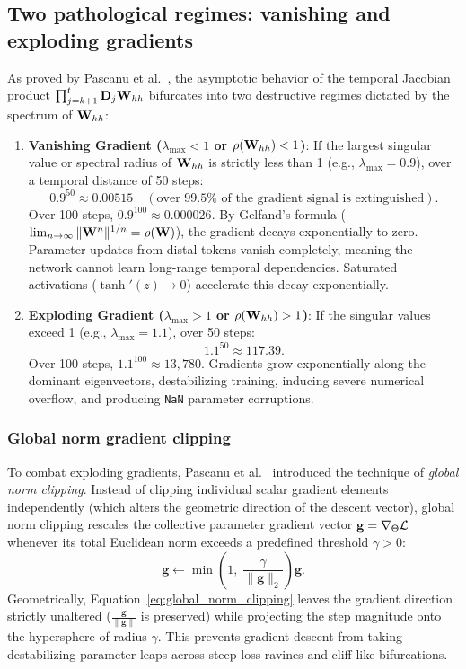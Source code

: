 \documentclass[../../main.tex]{subfiles}
\begin{document}
\subsection{Two pathological regimes: vanishing and exploding gradients}
As proved by Pascanu et al.~\cite{pascanu2013difficulty}, the asymptotic behavior of the temporal Jacobian product $\prod_{j=k+1}^t \mathbf{D}_j \mathbf{W}_{hh}$ bifurcates into two destructive regimes dictated by the spectrum of $\mathbf{W}_{hh}$:
\begin{enumerate}
    \item \textbf{Vanishing Gradient ($\lambda_{\max} < 1$ or $\rho(\mathbf{W}_{hh}) < 1$)}: If the largest singular value or spectral radius of $\mathbf{W}_{hh}$ is strictly less than 1 (e.g., $\lambda_{\max} = 0.9$), over a temporal distance of 50 steps:
    \[
    0.9^{50} \approx 0.00515 \quad (\text{over } 99.5\% \text{ of the gradient signal is extinguished}).
    \]
    Over 100 steps, $0.9^{100} \approx 0.000026$. By Gelfand's formula ($\lim_{n \to \infty} \|\mathbf{W}^n\|^{1/n} = \rho(\mathbf{W})$), the gradient decays exponentially to zero. Parameter updates from distal tokens vanish completely, meaning the network cannot learn long-range temporal dependencies. Saturated activations ($\tanh'(z) \to 0$) accelerate this decay exponentially.
    \item \textbf{Exploding Gradient ($\lambda_{\max} > 1$ or $\rho(\mathbf{W}_{hh}) > 1$)}: If the singular values exceed 1 (e.g., $\lambda_{\max} = 1.1$), over 50 steps:
    \[
    1.1^{50} \approx 117.39.
    \]
    Over 100 steps, $1.1^{100} \approx 13{,}780$. Gradients grow exponentially along the dominant eigenvectors, destabilizing training, inducing severe numerical overflow, and producing \texttt{NaN} parameter corruptions.
\end{enumerate}

\subsubsection{Global norm gradient clipping}
To combat exploding gradients, Pascanu et al.~\cite{pascanu2013difficulty} introduced the technique of \emph{global norm clipping}. Instead of clipping individual scalar gradient elements independently (which alters the geometric direction of the descent vector), global norm clipping rescales the collective parameter gradient vector $\mathbf{g} = \nabla_\Theta \mathcal{L}$ whenever its total Euclidean norm exceeds a predefined threshold $\gamma > 0$:
\begin{equation}
\label{eq:global_norm_clipping}
\mathbf{g} \leftarrow \min\left(1, \; \frac{\gamma}{\|\mathbf{g}\|_2}\right) \mathbf{g}.
\end{equation}
Geometrically, Equation~\eqref{eq:global_norm_clipping} leaves the gradient direction strictly unaltered ($\frac{\mathbf{g}}{\|\mathbf{g}\|}$ is preserved) while projecting the step magnitude onto the hypersphere of radius $\gamma$. This prevents gradient descent from taking destabilizing parameter leaps across steep loss ravines and cliff-like bifurcations.
\end{document}
